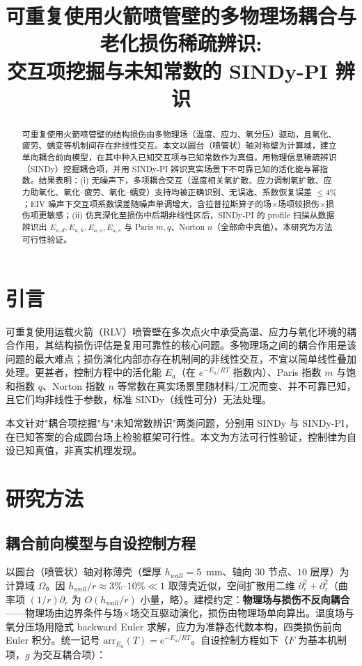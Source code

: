 \documentclass[11pt,a4paper]{article}
\title{\bfseries 可重复使用火箭喷管壁的多物理场耦合与老化损伤稀疏辨识:\\[2pt]\large 交互项挖掘与未知常数的 SINDy-PI 辨识}
\date{}
\begin{document}
\maketitle

\begin{abstract}
\noindent 可重复使用火箭喷管壁的结构损伤由多物理场（温度、应力、氧分压）驱动，且氧化、疲劳、蠕变等机制间存在非线性交互。本文以圆台（喷管状）轴对称壁为计算域，建立单向耦合前向模型，在其中种入已知交互项与已知常数作为真值，用物理信息稀疏辨识（SINDy）挖掘耦合项，并用 SINDy-PI 辨识真实场景下不可靠已知的活化能与幂指数。结果表明：(i) 无噪声下，多项耦合交互（温度相关氧扩散、应力调制氧扩散、应力助氧化、氧化–疲劳、氧化–蠕变）支持均被正确识别、无误选、系数恢复误差 $\le 4\%$；EIV 噪声下交互项系数误差随噪声单调增大，含拉普拉斯算子的场×场项较损伤×损伤项更敏感；(ii) 仿真深化至损伤中后期非线性区后，SINDy-PI 的 profile 扫描从数据辨识出 $E_{a,d},E_{a,h},E_{a,o},E_{a,c}$ 与 Paris $m,q$、Norton $n$（全部命中真值）。本研究为方法可行性验证。
\end{abstract}

\section{引言}
可重复使用运载火箭（RLV）喷管壁在多次点火中承受高温、应力与氧化环境的耦合作用，其结构损伤评估是复用可靠性的核心问题。多物理场之间的耦合作用是该问题的最大难点；损伤演化内部亦存在机制间的非线性交互，不宜以简单线性叠加处理。更甚者，控制方程中的活化能 $E_a$（在 $e^{-E_a/RT}$ 指数内）、Paris 指数 $m$ 与饱和指数 $q$、Norton 指数 $n$ 等常数在真实场景里随材料/工况而变、并不可靠已知，且它们均非线性于参数，标准 SINDy（线性可分）无法处理。

本文针对"耦合项挖掘"与"未知常数辨识"两类问题，分别用 SINDy 与 SINDy-PI，在已知答案的合成圆台场上检验框架可行性。本文为方法可行性验证，控制律为自设已知真值，非真实机理发现。

\section{研究方法}

\subsection{耦合前向模型与自设控制方程}
以圆台（喷管状）轴对称薄壳（壁厚 $h_{wall}=5$~mm、轴向 $30$ 节点、$10$ 层厚）为计算域 $\Omega$。因 $h_{wall}/r\approx 3\%$--$10\%\ll 1$ 取薄壳近似，空间扩散用二维 $\partial_r^2+\partial_z^2$（曲率项 $(1/r)\partial_r$ 为 $O(h_{wall}/r)$ 小量，略）。建模约定：\textbf{物理场与损伤不反向耦合}——物理场由边界条件与场×场交互驱动演化，损伤由物理场单向算出。温度场与氧分压场用隐式 backward Euler 求解，应力为准静态代数本构，四类损伤前向 Euler 积分。统一记号 $\mathrm{arr}_{E_a}(T)=e^{-E_a/RT}$。自设控制方程如下（$F$ 为基本机制项，$g$ 为交互耦合项）：
\end{document}
